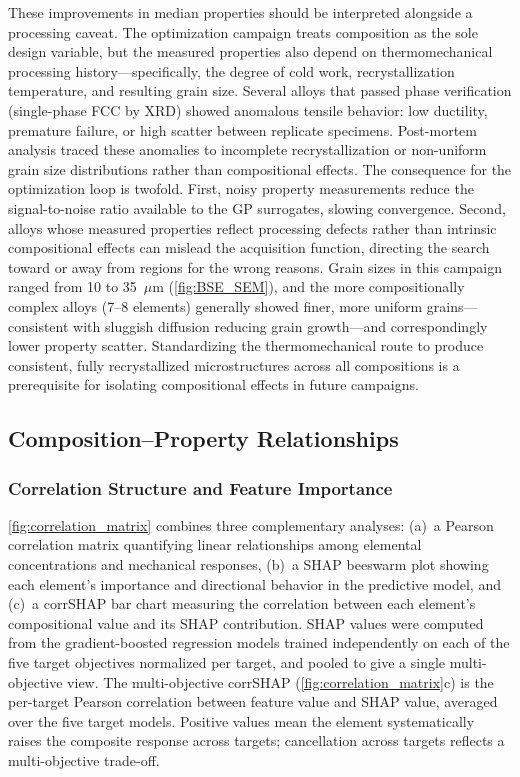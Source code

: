 These improvements in median properties should be interpreted alongside a processing caveat. The optimization campaign treats composition as the sole design variable, but the measured properties also depend on thermomechanical processing history---specifically, the degree of cold work, recrystallization temperature, and resulting grain size. Several alloys that passed phase verification (single-phase FCC by XRD) showed anomalous tensile behavior: low ductility, premature failure, or high scatter between replicate specimens. Post-mortem analysis traced these anomalies to incomplete recrystallization or non-uniform grain size distributions rather than compositional effects. The consequence for the optimization loop is twofold. First, noisy property measurements reduce the signal-to-noise ratio available to the GP surrogates, slowing convergence. Second, alloys whose measured properties reflect processing defects rather than intrinsic compositional effects can mislead the acquisition function, directing the search toward or away from regions for the wrong reasons. Grain sizes in this campaign ranged from 10 to 35~$\mu$m (\autoref{fig:BSE_SEM}), and the more compositionally complex alloys (7--8 elements) generally showed finer, more uniform grains---consistent with sluggish diffusion reducing grain growth---and correspondingly lower property scatter. Standardizing the thermomechanical route to produce consistent, fully recrystallized microstructures across all compositions is a prerequisite for isolating compositional effects in future campaigns.

\subsection{Composition--Property Relationships}

\subsubsection{Correlation Structure and Feature Importance}

\autoref{fig:correlation_matrix} combines three complementary analyses: (a)~a Pearson correlation matrix quantifying linear relationships among elemental concentrations and mechanical responses, (b)~a SHAP beeswarm plot showing each element's importance and directional behavior in the predictive model, and (c)~a corrSHAP bar chart measuring the correlation between each element's compositional value and its SHAP contribution. SHAP values were computed from the gradient-boosted regression models trained independently on each of the five target objectives normalized per target, and pooled to give a single multi-objective view. The multi-objective corrSHAP (\autoref{fig:correlation_matrix}c) is the per-target Pearson correlation between feature value and SHAP value, averaged over the five target models. Positive values mean the element systematically raises the composite response across targets; cancellation across targets reflects a multi-objective trade-off.


